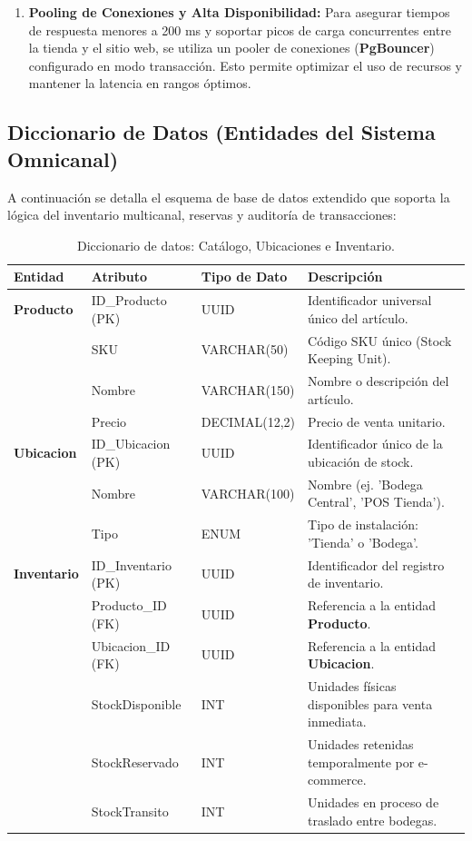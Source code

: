 \documentclass[12pt,a4paper]{article}
\begin{document}
\begin{enumerate}
    \item \textbf{Pooling de Conexiones y Alta Disponibilidad:} Para asegurar tiempos de respuesta menores a 200 ms y soportar picos de carga concurrentes entre la tienda y el sitio web, se utiliza un pooler de conexiones (\textbf{PgBouncer}) configurado en modo transacción. Esto permite optimizar el uso de recursos y mantener la latencia en rangos óptimos.
\end{enumerate}

\subsection{Diccionario de Datos (Entidades del Sistema Omnicanal)}
A continuación se detalla el esquema de base de datos extendido que soporta la lógica del inventario multicanal, reservas y auditoría de transacciones:

\begin{table}[h!]
\centering
\small
\begin{tabularx}{\textwidth}{@{}lllX@{}}
\toprule
\textbf{Entidad} & \textbf{Atributo} & \textbf{Tipo de Dato} & \textbf{Descripción} \\ \midrule
\textbf{Producto} & ID\_Producto (PK) & UUID & Identificador universal único del artículo. \\
 & SKU & VARCHAR(50) & Código SKU único (Stock Keeping Unit). \\
 & Nombre & VARCHAR(150) & Nombre o descripción del artículo. \\
 & Precio & DECIMAL(12,2) & Precio de venta unitario. \\ \addlinespace
\textbf{Ubicacion} & ID\_Ubicacion (PK) & UUID & Identificador único de la ubicación de stock. \\
 & Nombre & VARCHAR(100) & Nombre (ej. 'Bodega Central', 'POS Tienda'). \\
 & Tipo & ENUM & Tipo de instalación: 'Tienda' o 'Bodega'. \\ \addlinespace
\textbf{Inventario} & ID\_Inventario (PK) & UUID & Identificador del registro de inventario. \\
 & Producto\_ID (FK) & UUID & Referencia a la entidad \textbf{Producto}. \\
 & Ubicacion\_ID (FK) & UUID & Referencia a la entidad \textbf{Ubicacion}. \\
 & StockDisponible & INT & Unidades físicas disponibles para venta inmediata. \\
 & StockReservado & INT & Unidades retenidas temporalmente por e-commerce. \\
 & StockTransito & INT & Unidades en proceso de traslado entre bodegas. \\ \bottomrule
\end{tabularx}
\caption{Diccionario de datos: Catálogo, Ubicaciones e Inventario.}
\end{table}
\end{document}
